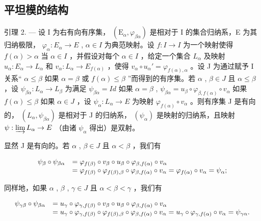 \subsection{平坦模的结构}

引理 2. --- 设 I 为右有向有序集， \((\mathrm{E}_{\alpha}, \varphi_{\beta\alpha})\) 是相对于 I 的集合归纳系，E 为其归纳极限， \(\varphi_{\alpha}: E_{\alpha} \to E\) , \(\alpha \in I\) 为典范映射。设 \(f: I \to I\) 为一个映射使得 \(f(\alpha) > \alpha\) 当 \(\alpha \in I\) ，并假设对每个 \(\alpha \in I\) ，给定一个集合 \(L_{\alpha}\) 及映射 \(u_{\alpha}: E_{\alpha} \to L_{\alpha}\) 和 \(v_{\alpha}: L_{\alpha} \to E_{f(\alpha)}\) ，使得 \(v_{\alpha} \circ u_{\alpha}' = \varphi_{f(\alpha),\alpha}\) 。设 J 为通过赋予 I 关系“ \(\alpha \leqslant \beta\) 如果 \(\alpha = \beta\) 或 \(f(\alpha) \leqslant \beta\) ”而得到的有序集。若 \(\alpha\) , \(\beta \in J\) 且 \(\alpha \leqslant \beta\) ，设 \(\psi_{\beta\alpha}: L_{\alpha} \to L_{\beta}\) 为满足 \(\psi_{\beta\alpha} = Id\) 如果 \(\alpha = \beta\) , \(\psi_{\beta\alpha} = u_{\beta} \circ \varphi_{\beta,f(\alpha)} \circ v_{\alpha}\) 如果 \(f(\alpha) \leqslant \beta\) 如果 \(\alpha \in J\) ，设 \(\psi_{\alpha}: L_{\alpha} \to E\) 为映射 \(\varphi_{f(\alpha)} \circ v_{\alpha}\) 。则有序集 J 是有向的， \((L_{\alpha}, \psi_{\beta\alpha})\) 是相对于 J 的归纳系， \((\psi_{\alpha})\) 是映射的归纳系，且映射 \(\psi: \varinjlim L_{\alpha} \to E\) （由诸 \(\psi_{\alpha}\) 得出）是双射。

显然 J 是有向的。若 \(\alpha\) , \(\beta \in J\) 且 \(\alpha < \beta\) ，我们有

\[
\begin{array}{r l} \psi_ {\beta} \circ \psi_ {\beta \alpha} & = \varphi_ {f (\beta)} \circ v _ {\beta} \circ u _ {\beta} \circ \varphi_ {\beta , f (\alpha)} \circ v _ {\alpha} \\ & = \varphi_ {f (\beta)} \circ \varphi_ {f (\beta), \beta} \circ \varphi_ {\beta , f (\alpha)} \circ v _ {\alpha} = \varphi_ {f (\alpha)} \circ v _ {\alpha} = \psi_ {\alpha}; \end{array}
\]

同样地，如果 \(\alpha\) , \(\beta\) , \(\gamma \in J\) 且 \(\alpha < \beta < \gamma\) ，我们有

\[
\begin{array}{r l} \psi_ {\gamma \beta} \circ \psi_ {\beta \alpha} & = u _ {\gamma} \circ \varphi_ {\gamma , f (\beta)} \circ v _ {\beta} \circ u _ {\beta} \circ \varphi_ {\beta , f (\alpha)} \circ v _ {\alpha} \\ & = u _ {\gamma} \circ \varphi_ {\gamma , f (\beta)} \circ \varphi_ {f (\beta), \beta} \circ \varphi_ {\beta , f (\alpha)} \circ v _ {\alpha} = u _ {\gamma} \circ \varphi_ {\gamma , f (\alpha)} \circ v _ {\alpha} = \psi_ {\gamma \alpha}. \end{array}
\]

